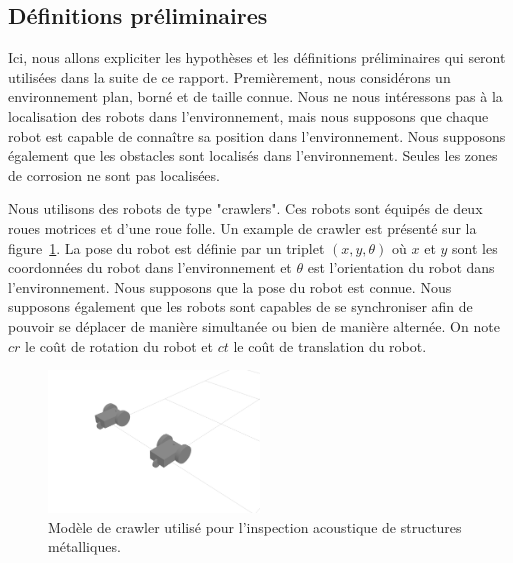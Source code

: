 \documentclass[francais,RandD]{rapportPFE}
\begin{document}
		\subsection{Définitions préliminaires}
			Ici, nous allons expliciter les hypothèses et les définitions préliminaires qui seront utilisées dans la suite de ce rapport.
			Premièrement, nous considérons un environnement plan, borné et de taille connue.
			Nous ne nous intéressons pas à la localisation des robots dans l'environnement, mais nous supposons que chaque robot est capable de connaître sa position dans l'environnement.
			Nous supposons également que les obstacles sont localisés dans l'environnement.
			Seules les zones de corrosion ne sont pas localisées.

			Nous utilisons des robots de type "crawlers". Ces robots sont équipés de deux roues motrices et d'une roue folle.
			Un example de crawler est présenté sur la figure~\ref{fig:crawler}.
			La pose du robot est définie par un triplet $(x, y, \theta)$ où $x$ et $y$ sont les coordonnées du robot dans l'environnement et $\theta$ est l'orientation du robot dans l'environnement.
			Nous supposons que la pose du robot est connue.
			Nous supposons également que les robots sont capables de se synchroniser afin de pouvoir se déplacer de manière simultanée ou bien de manière alternée.
			On note $cr$ le coût de rotation du robot et $ct$ le coût de translation du robot.

			\begin{figure}[h!]
				\centering
				\includegraphics[width=0.5\textwidth]{graphics/crawlers.png}
				\caption{Modèle de crawler utilisé pour l'inspection acoustique de structures métalliques.}
				\label{fig:crawler}
			\end{figure}
\end{document}
